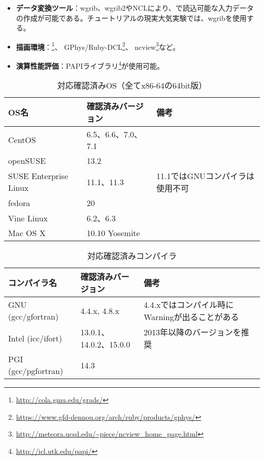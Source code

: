 \begin{itemize}
  \item {\bf データ変換ツール}：wgrib、wgrib2やNCLにより、\scalerm で読込可能な入力データの作成が可能である。チュートリアルの現実大気実験では、wgribを使用する。
  \item {\bf 描画環境}：\grads \footnote{\url{http://cola.gmu.edu/grads/}}、
GPhys/Ruby-DCL\footnote{\url{https://www.gfd-dennou.org/arch/ruby/products/gphys/}}、
ncview\footnote{\url{http://meteora.ucsd.edu/~piece/ncview\_home\_page.html}}など。
  \item {\bf 演算性能評価}：PAPIライブラリ\footnote{\url{http://icl.utk.edu/papi/}}が使用可能。
\end{itemize}


\begin{table}[htb]
\begin{center}
\caption{対応確認済みOS（全てx86-64の64bit版）}
\begin{tabularx}{150mm}{|l|l|X|} \hline
 \rowcolor[gray]{0.9} OS名 & 確認済みバージョン & 備考 \\ \hline
 CentOS                & 6.5、6.6、7.0、7.1 &  \\ \hline
 openSUSE              & 13.2               &  \\ \hline
 SUSE Enterprise Linux & 11.1、11.3         & 11.1ではGNUコンパイラは使用不可 \\ \hline
 fedora                & 20                 &  \\ \hline
 Vine Linux            & 6.2、6.3           &  \\ \hline
 Mac OS X              & 10.10 Yosemite     &  \\ \hline
\end{tabularx}
\label{tab:compatible_os}
\end{center}
\end{table}

\begin{table}[htb]
\begin{center}
\caption{対応確認済みコンパイラ}
\begin{tabularx}{150mm}{|l|l|X|} \hline
 \rowcolor[gray]{0.9} コンパイラ名 & 確認済みバージョン & 備考 \\ \hline
 GNU (gcc/gfortran)    & 4.4.x, 4.8.x           & 4.4.xではコンパイル時にWarningが出ることがある \\ \hline
 Intel (icc/ifort)     & 13.0.1、14.0.2、15.0.0 & 2013年以降のバージョンを推奨 \\ \hline
 PGI (gcc/pgfortran)   & 14.3                   &  \\ \hline
\end{tabularx}
\label{tab:compatible_compiler}
\end{center}
\end{table}

